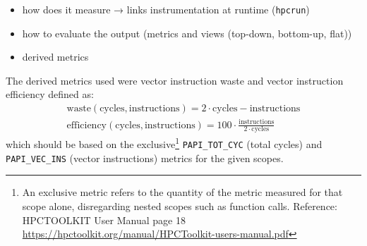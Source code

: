 \documentclass[a4paper, 11pt]{memoir}
\begin{document}
    \begin{itemize}
        \item how does it measure →  links instrumentation at runtime (\texttt{hpcrun})
        \item how to evaluate the output (metrics and views (top-down, bottom-up, flat))
        \item derived metrics
    \end{itemize}

    The derived metrics used were vector instruction waste and vector instruction efficiency defined as:
    \begin{align}
        \text{waste}(\text{cycles}, \text{instructions}) = 2 \cdot \text{cycles} - \text{instructions} \label{eq:vec_waste}\\
        \text{efficiency}(\text{cycles}, \text{instructions}) = 100 \cdot \frac{\text{instructions}}{2\cdot\text{cycles}}
        \label{eq:vec_efficiency}
    \end{align}
    which should be based on the exclusive\footnote{An exclusive metric refers to the quantity of the metric measured
    for that scope alone, disregarding nested scopes such as function calls. Reference: HPCTOOLKIT User Manual page 18
    \href{https://hpctoolkit.org/manual/HPCToolkit-users-manual.pdf}{https://hpctoolkit.org/manual/HPCToolkit-users-manual.pdf}}
    \texttt{PAPI_TOT_CYC} (total cycles) and \texttt{PAPI_VEC_INS}
    (vector instructions) metrics for the given scopes.


% 
\end{document}

